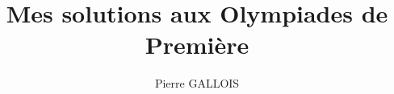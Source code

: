 \documentclass[a4paper,12pt, titlepage]{book}
\begin{document}
	
\renewcommand{\chaptername}{Exercice}

\author{Pierre GALLOIS}
\title{Mes solutions aux Olympiades de Première}

\maketitle

\setcounter{tocdepth}{0}
\tableofcontents




\end{document}
